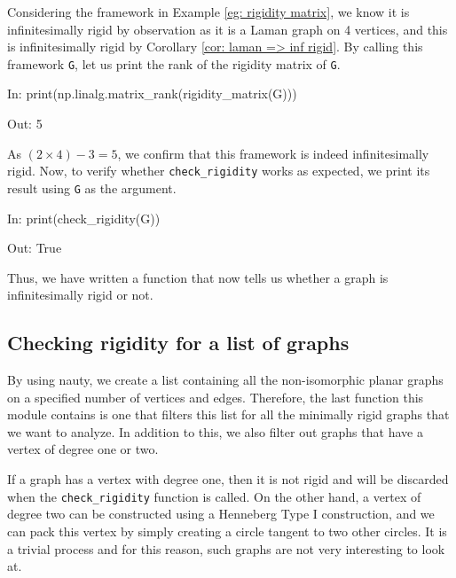 \begin{flushleft}
Considering the framework in Example \ref{eg: rigidity matrix}, we know it is infinitesimally rigid by observation as it is a Laman graph on 4 vertices, and this is infinitesimally rigid by Corollary \ref{cor: laman => inf rigid}. By calling this framework \texttt{G}, let us print the rank of the rigidity matrix of \texttt{G}.
\end{flushleft}

\begin{code}
    In: print(np.linalg.matrix_rank(rigidity_matrix(G)))

    Out: 5
\end{code}

\begin{flushleft}
As $(2 \times 4) - 3 = 5$, we confirm that this framework is indeed infinitesimally rigid. Now, to verify whether \texttt{check\_rigidity} works as expected, we print its result using \texttt{G} as the argument. 
\end{flushleft}

\begin{code}
    In: print(check_rigidity(G))

    Out: True
\end{code}

\begin{flushleft}
Thus, we have written a function that now tells us whether a graph is infinitesimally rigid or not.
\end{flushleft}

\subsection{Checking rigidity for a list of graphs}

\begin{flushleft}
By using nauty, we create a list containing all the non-isomorphic planar graphs on a specified number of vertices and edges. Therefore, the last function this module contains is one that filters this list for all the minimally rigid graphs that we want to analyze. In addition to this, we also filter out graphs that have a vertex of degree one or two. 
\end{flushleft}

\begin{flushleft}
If a graph has a vertex with degree one, then it is not rigid and will be discarded when the \texttt{check\_rigidity} function is called. On the other hand, a vertex of degree two can be constructed using a Henneberg Type I construction, and we can pack this vertex by simply creating a circle tangent to two other circles. It is a trivial process and for this reason, such graphs are not very interesting to look at.
\end{flushleft}

